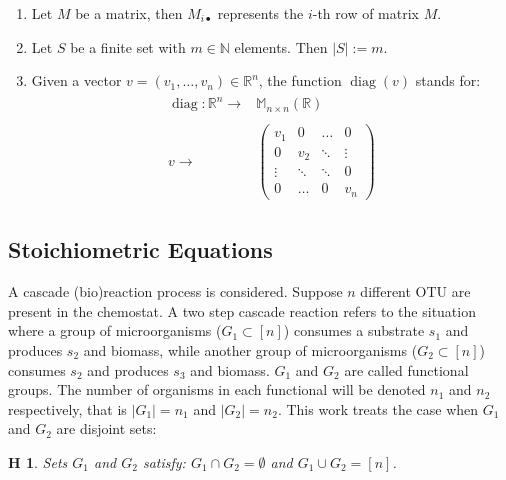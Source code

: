 \documentclass[processes,article,submit,moreauthors,pdftex]{Definitions/mdpi}
\newcommand{\N}{\mathbb{N}}
\newcommand{\R}{\mathbb{R}}
\DeclareMathOperator{\diag}{diag}
\newtheorem{hypo}{H}
\begin{document}
\begin{enumerate}
	\item Let $M$ be a matrix, then $M_{i\bullet}$ represents the $i$-th row of matrix $M$.
	\item Let $S$ be a finite set with $m \in \N$ elements. Then $\vert S \vert := m$. 
	\item Given a vector $v=(v_1,\dots, v_n)\in \R^n$, the function $\diag(v)$ stands for:
	\begin{align}
	\begin{array}{rc}
	\diag:\R^n \rightarrow & \mathbb{M}_{n\times n}(\R)\\
	& \\
	v \rightarrow & \begin{pmatrix}
	v_1 & 0 & \dots & 0 \\
	0 & v_2 & \ddots & \vdots\\ 
	\vdots & \ddots & \ddots& 0 \\
	0 & \dots &0 & v_n 
	\end{pmatrix}
	\end{array} \label{inter:diag_operator}
	\end{align}
\end{enumerate}

\subsection{Stoichiometric Equations}
A cascade (bio)reaction process is considered. Suppose $n$ different OTU are present in the chemostat. A two step cascade reaction refers to the situation where a group of microorganisms ($G_1 \subset [n] $) consumes a substrate $s_1$ and produces $s_2$ and biomass, while another group of microorganisms ($G_2\subset [n]$) consumes $s_2$ and produces $s_3$ and biomass. $G_1$ and $G_2$ are called functional groups. The number of organisms in each functional will be denoted $n_1$ and $n_2$ respectively, that is $\vert G_1 \vert = n_1$ and $\vert G_2 \vert = n_2$. This work treats the case when $G_1$ and $G_2$ are disjoint sets:

\begin{hypo}  Sets $G_1$ and $G_2$ satisfy: $G_1 \cap G_2 = \emptyset$ and $G_1 \cup G_2 = [n]$. 
\end{hypo}
\end{document}

